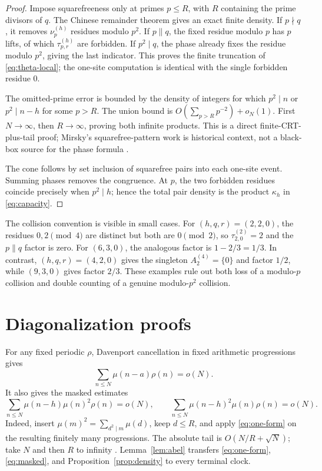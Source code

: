 \documentclass[11pt]{article}
\theoremstyle{definition}
\theoremstyle{remark}
\newcommand{\mob}{\mu}
\newcommand{\kap}{\kappa}
\begin{document}
\begin{proof}
Impose squarefreeness only at primes \(p\le R\), with \(R\) containing
the prime divisors of \(q\).  The Chinese remainder theorem gives an exact
finite density.  If \(p\nmid q\), it removes \(\nu_p^{(h)}\) residues
modulo \(p^2\).  If \(p\parallel q\), the fixed residue modulo \(p\) has
\(p\) lifts, of which \(\tau_{p,r}^{(h)}\) are forbidden.  If
\(p^2\mid q\), the phase already fixes the residue modulo \(p^2\), giving
the last indicator.  This proves the finite truncation of
\eqref{eq:theta-local}; the one-site computation is identical with the
single forbidden residue \(0\).

The omitted-prime error is bounded by the density of integers for which
\(p^2\mid n\) or \(p^2\mid n-h\) for some \(p>R\).  The union bound is
\(O(\sum_{p>R}p^{-2})+o_N(1)\).  First \(N\to\infty\), then
\(R\to\infty\), proving both infinite products.  This is a direct
finite-CRT-plus-tail proof; Mirsky's squarefree-pattern work is historical
context, not a black-box source for the phase formula \cite{Mirsky1948}.

The cone follows by set inclusion of squarefree pairs into each one-site
event.  Summing phases removes the congruence.  At \(p\), the two forbidden
residues coincide precisely when \(p^2\mid h\); hence the total pair
density is the product \(\kap_h\) in \eqref{eq:capacity}.
\end{proof}

The collision convention is visible in small cases.  For
\((h,q,r)=(2,2,0)\), the residues \(0,2\pmod4\) are distinct but both are
\(0\pmod2\), so \(\tau_{2,0}^{(2)}=2\) and the \(p\parallel q\) factor is
zero.  For \((6,3,0)\), the analogous factor is \(1-2/3=1/3\).  In
contrast, \((h,q,r)=(4,2,0)\) gives the singleton
\(A_2^{(4)}=\{0\}\) and factor \(1/2\), while \((9,3,0)\) gives factor
\(2/3\).  These examples rule out
both loss of a modulo-\(p\) collision and double counting of a genuine
modulo-\(p^2\) collision.

\section{Diagonalization proofs}

For any fixed periodic \(\rho\), Davenport cancellation in fixed
arithmetic progressions gives
\begin{equation}
 \sum_{n\le N}\mob(n-a)\rho(n)=o(N).
 \label{eq:one-form}
\end{equation}
It also gives the masked estimates
\begin{equation}
 \sum_{n\le N}\mob(n-h)\mob(n)^2\rho(n)=o(N),\qquad
 \sum_{n\le N}\mob(n-h)^2\mob(n)\rho(n)=o(N).
 \label{eq:masked}
\end{equation}
Indeed, insert \(\mob(m)^2=\sum_{d^2\mid m}\mob(d)\), keep
\(d\le R\), and apply \eqref{eq:one-form} on the resulting finitely many
progressions.  The absolute tail is \(O(N/R+\sqrt N)\); take \(N\) and
then \(R\) to infinity \cite{Davenport1937}.  Lemma~\ref{lem:abel}
transfers \eqref{eq:one-form}, \eqref{eq:masked}, and
Proposition~\ref{prop:density} to every terminal clock.
\end{document}
